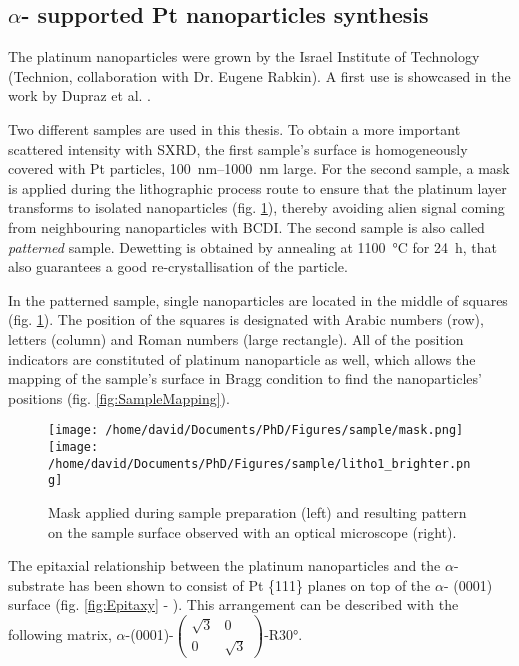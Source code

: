 \subsection{$\alpha$- supported Pt nanoparticles synthesis}\label{sec:PtParticles}

The platinum nanoparticles were grown by the Israel Institute of Technology (Technion, collaboration with Dr. Eugene Rabkin).
A first use is showcased in the work by Dupraz et al. \parencite*{Dupraz2017}.

Two different samples are used in this thesis.
To obtain a more important scattered intensity with SXRD, the first sample's surface is homogeneously covered with Pt particles, \qtyrange{100}{1000}{\nm} large.
For the second sample, a mask is applied during the lithographic process route to ensure that the platinum layer transforms to isolated nanoparticles (fig. \ref{fig:Mask}), thereby avoiding alien signal coming from neighbouring nanoparticles with BCDI.
The second sample is also called \textit{patterned} sample.
Dewetting is obtained by annealing at \qty{1100}{\degreeCelsius} for \qty{24}{\hour}, that also guarantees a good re-crystallisation of the particle.

In the patterned sample, single nanoparticles are located in the middle of squares (fig. \ref{fig:Mask}).
The position of the squares is designated with Arabic numbers (row), letters (column) and Roman numbers (large rectangle).
All of the position indicators are constituted of platinum nanoparticle as well, which allows the mapping of the sample's surface in Bragg condition to find the nanoparticles' positions (fig. \ref{fig:SampleMapping}).

\begin{figure}[!htb]
    \centering
    \texttt{[image: /home/david/Documents/PhD/Figures/sample/mask.png]}
    \texttt{[image: /home/david/Documents/PhD/Figures/sample/litho1\_brighter.png]}
    \caption{
        Mask applied during sample preparation (left) and resulting pattern on the sample surface observed with an optical microscope (right).
    }
    \label{fig:Mask}
\end{figure}

The epitaxial relationship between the platinum nanoparticles and the $\alpha$- substrate has been shown to consist of Pt \{111\} planes on top of the $\alpha$- (0001) surface (fig. \ref{fig:Epitaxy} - \cite{Farrow1993}).
This arrangement can be described with the following matrix, $\alpha$-(0001)-$\begin{pmatrix} \sqrt{3} & 0\\ 0 & \sqrt{3} \end{pmatrix}$-R\ang{30}.

